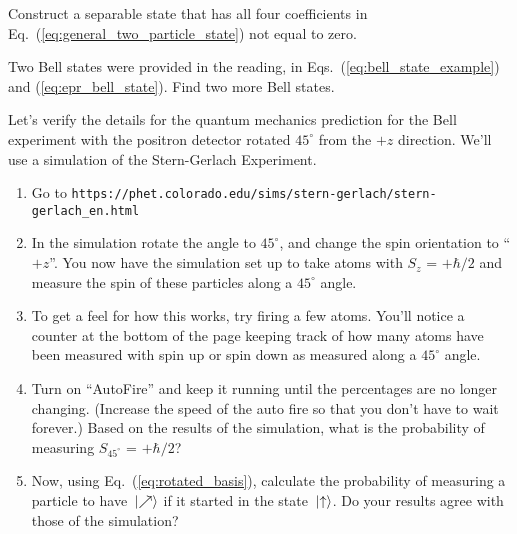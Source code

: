  
\begin{problem}
  Construct a separable state that has all four coefficients in
  Eq.~(\ref{eq:general_two_particle_state}) not equal to zero.
\end{problem}


\begin{problem}
  Two Bell states were provided in the reading, in
  Eqs.~(\ref{eq:bell_state_example}) and (\ref{eq:epr_bell_state}).
  Find two more Bell states.
\end{problem}



\begin{problem}
  Let's verify the details for the quantum mechanics prediction
  for the Bell experiment with the positron detector rotated
  $45^\circ$ from the $+z$ direction.  We'll use a simulation of the 
  Stern-Gerlach Experiment.
 \begin{enumerate}
  \item Go to \verb+https://phet.colorado.edu/sims/stern-gerlach/stern-gerlach_en.html+
  \item In the simulation rotate the angle to $45^\circ$, and change
  the spin orientation to ``$+z$''.  You now have the simulation set up
  to take atoms with $S_z$ = $+\hbar/2$ and measure the spin of these
  particles along a $45^\circ$ angle.
  \item To get a feel for how this works, try firing a few atoms.
  You'll notice a counter at the bottom of the page keeping track of how
  many atoms have been measured with spin up or spin down as measured
  along a $45^\circ$ angle.
  \item  Turn on ``AutoFire'' and keep it running until the percentages
  are no longer changing. (Increase the speed of the auto fire so that you 
don't have to wait forever.)  Based on the results of the simulation,
  what is the probability of measuring $S_{45^\circ}$  = $+\hbar/2$?
  \item Now, using Eq.~(\ref{eq:rotated_basis}), calculate the probability
  of measuring a particle to have $\,|\mbox{$\nearrow$}\rangle$ if it started in
  the state $\,|\mbox{$\uparrow$}\rangle$.  Do your results agree with those of
  the simulation?
 \end{enumerate}
\label{prob:epr_sim}
\end{problem}

